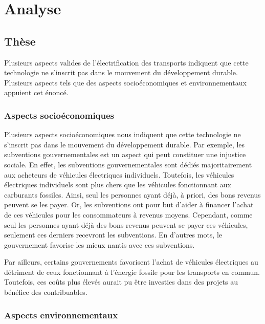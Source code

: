 
\chapter{Analyse}

\section{Thèse}

Plusieurs aspects valides de l'électrification des transports indiquent que cette technologie ne s'inscrit pas dans le mouvement du développement durable.
Plusieurs aspects tels que des aspects socioéconomiques et environnementaux appuient cet énoncé.

\subsection{Aspects socioéconomiques}

Plusieurs aspects socioéconomiques nous indiquent que cette technologie ne s'inscrit pas dans le mouvement du développement durable. Par exemple, les subventions gouvernementales est un aspect qui peut constituer une injustice sociale. En effet, les subventions gouvernementales sont dédiés majoritairement aux acheteurs de véhicules électriques individuels. Toutefois, les véhicules électriques individuels sont plus chers que les véhicules fonctionnant aux carburants fossiles. Ainsi, seul les personnes ayant déjà, à priori, des bons revenus peuvent se les payer. Or, les subventions ont pour but d'aider à financer l'achat de ces véhicules pour les consommateurs à revenus moyens. Cependant, comme seul les personnes ayant déjà des bons revenus peuvent se payer ces véhicules, seulement ces derniers recevront les subventions. En d'autres mots, le gouvernement favorise les mieux nantis avec ces subventions.

Par ailleurs, certains gouvernements favorisent l'achat de véhicules électriques au détriment de ceux fonctionnant à l'énergie fossile pour les transports en commun. Toutefois, ces coûts plus élevés aurait pu être investies dans des projets au bénéfice des contribuables.

\subsection{Aspects environnementaux}

